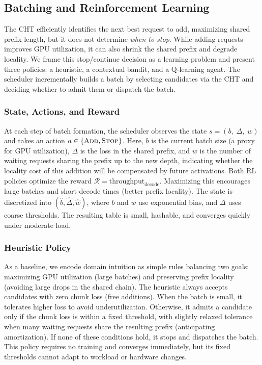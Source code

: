\vspace{-7pt}

\subsection{Batching and Reinforcement Learning}
\label{subsec:batching_rl}
The CHT efficiently identifies the next best request to add, maximizing shared prefix length, but it does not determine \textit{when to stop}. While adding requests improves GPU utilization, it can also shrink the shared prefix and degrade locality. We frame this stop/continue decision as a learning problem and present three policies: a heuristic, a contextual bandit, and a Q-learning agent. The scheduler incrementally builds a batch by selecting candidates via the CHT and deciding whether to admit them or dispatch the batch.

\vspace{-6pt}

\subsubsection*{State, Actions, and Reward}
At each step of batch formation, the scheduler observes the state $s = (\mathit{b},\; \Delta,\; \mathit{w})$ and takes an action $a \in \{\textsc{Add}, \textsc{Stop}\}$. Here, $b$ is the current batch size (a proxy for GPU utilization), $\Delta$ is the loss in the shared prefix, and $w$ is the number of waiting requests sharing the prefix up to the new depth, indicating whether the locality cost of this addition will be compensated by future activations. Both RL policies optimize the reward $\mathcal{R} = \text{throughput}_{\mathrm{decode}}$. Maximizing this encourages large batches and short decode times (better prefix locality). The state is discretized into $(\hat{b}, \hat{\Delta}, \hat{w})$, where $b$ and $w$ use exponential bins, and $\Delta$ uses coarse thresholds. The resulting table is small, hashable, and converges quickly under moderate load.

\vspace{-6pt}

\subsubsection*{Heuristic Policy}
As a baseline, we encode domain intuition as simple rules balancing two goals: maximizing GPU utilization (large batches) and preserving prefix locality (avoiding large drops in the shared chain). The heuristic always accepts candidates with zero chunk loss (free additions). When the batch is small, it tolerates higher loss to avoid underutilization. Otherwise, it admits a candidate only if the chunk loss is within a fixed threshold, with slightly relaxed tolerance when many waiting requests share the resulting prefix (anticipating amortization). If none of these conditions hold, it stops and dispatches the batch. This policy requires no training and converges immediately, but its fixed thresholds cannot adapt to workload or hardware changes.

